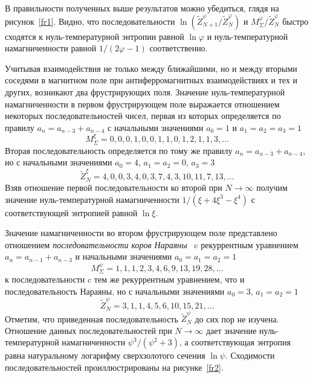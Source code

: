 
В правильности полученных выше результатов можно убедиться, глядя на рисунок~\ref{fr1}. Видно, что последовательности $\ln (\widetilde{Z}_{N+1}^{\varphi}/\widetilde{Z}_{N}^{\varphi})$ и $M_{\Sigma}^{\varphi}/\widetilde{Z}_{N}^{\varphi}$ быстро сходятся к нуль-температурной энтропии равной $\ln \varphi$ и нуль-температурной намагниченности равной $1/(2\varphi - 1)$ соответственно.

Учитывая взаимодействия не только между ближайшими, но и между вторыми соседями в магнитном поле при антиферромагнитных взаимодействиях и тех и других, возникают два фрустрирующих поля. Значение нуль-температурной намагниченности в первом фрустрирующем поле выражается отношением некоторых последовательностей чисел, первая из которых определяется по правилу $a_n = a_{n-3} + a_{n-4}$ с начальными значениями $a_0 = 1$ и $a_1 = a_2 = a_3 = 1$
\[M^{\xi}_{\Sigma} = 0, 0, 0, 1, 0, 0, 1, 1, 0, 1, 2, 1, 1, 3, \dots\]
Вторая последовательность определяется по тому же правилу $a_n = a_{n-3} + a_{n-4}$, но с начальными значениями $a_0 = 4$, $a_1 = a_2 = 0$, $a_3 = 3$  \[\widetilde{Z}^{\xi}_{N} = 4, 0, 0, 3, 4, 0, 3, 7, 4, 3, 10, 11, 7, 13, \dots\]
Взяв отношение первой последовательности ко второй при $N\rightarrow \infty$ получим значение нуль-температурной намагниченности $1/(\xi+4\xi^3-\xi^4)$ с соответствующей энтропией равной $\ln \xi$.

Значение намагниченности во втором фрустрирующем поле представлено отношением \emph{последовательности коров Нараяны}~\cite{allouche1996, lin2021} c рекуррентным уравнением $a_n = a_{n-1} + a_{n-3}$ и начальными значениями $a_0 = a_1 = a_2 = 1$
\[M^{\psi}_{\Sigma} = 1, 1, 1 , 2, 3, 4, 6, 9, 13, 19, 28, \dots\] к последовательности c тем же рекуррентным уравнением, что и последовательность Нараяны, но с начальными значениями $a_0 = 3$, $a_1 = a_2 = 1$ \[\widetilde{Z}^{\psi}_{N} = 3, 1, 1, 4, 5, 6, 10, 15, 21, \dots\] Отметим, что приведенная последовательность $\widetilde{Z}^{\psi}_{N}$ до сих пор не изучена. 
Отношение данных последовательностей при $N\rightarrow \infty$ дает значение нуль-температурной намагниченности $\psi^3/(\psi^2+3)$, а соответствующая энтропия равна натуральному логарифму сверхзолотого сечения $\ln \psi$. Сходимости последовательностей проиллюстрированы на рисунке~\ref{fr2}.

